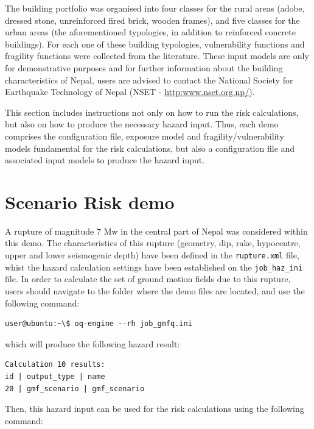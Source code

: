 The building portfolio was organised into four classes for the rural areas (adobe, dressed stone, unreinforced fired brick, wooden frames), and five classes for the urban areas (the aforementioned typologies, in addition to reinforced concrete buildings). For each one of these building typologies, \glspl{vulnerability function} and \glspl{fragility function} were collected from the literature. These input models are only for demonstrative purposes and for further information about the building characteristics of Nepal, users are advised to contact the National Society for Earthquake Technology of Nepal (NSET - \href{http://www.nset.org.np/}{http:www.nset.org.np/}).

This section includes instructions not only on how to run the risk calculations, but also on how to produce the necessary hazard input. Thus, each demo comprises the configuration file, exposure model and fragility/vulnerability models fundamental for the risk calculations, but also a configuration file and associated input models to produce the hazard input.

\section{Scenario Risk demo}
A rupture of magnitude 7 Mw in the central part of Nepal was considered within this demo. The characteristics of this rupture (geometry, dip, rake, hypocentre,  upper and lower seismogenic depth) have been defined in the \verb+rupture.xml+ file, whist the hazard calculation settings have been established on the \verb+job_haz_ini+ file. In order to calculate the set of ground motion fields due to this rupture, users should navigate to the folder where the demo files are located, and use the following command:

\begin{Verbatim}[frame=single, commandchars=\\\{\}, samepage=true]
user@ubuntu:~\$ oq-engine --rh job_gmfq.ini
\end{Verbatim}

which will produce the following hazard result:

\begin{Verbatim}[frame=single, commandchars=\\\{\}, samepage=true]
Calculation 10 results:
id | output_type | name
20 | gmf_scenario | gmf_scenario
\end{Verbatim}

Then, this hazard input can be used for the risk calculations using the following command:

